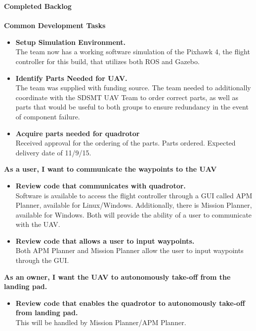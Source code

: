 \vspace{5mm}
\noindent\Large{\textbf{Completed Backlog}}\\
\vspace{2mm}\\
\large{\textbf{Common Development Tasks}}
\normalsize
\begin{itemize}
\item \textbf{Setup Simulation Environment.}\\
The team now has a working software simulation of the Pixhawk 4, the flight controller for this build, that utilizes both ROS and Gazebo.
\item \textbf{Identify Parts Needed for UAV.} \\
The team was supplied with funding source. The team needed to additionally coordinate with the SDSMT UAV Team to order correct parts, as well as parts that would be useful to both groups to ensure redundancy in the event of component failure.
\item \textbf{Acquire parts needed for quadrotor} \\
Received approval for the ordering of the parts. Parts ordered. Expected delivery date of 11/9/15.
\end{itemize}

\vspace{3mm}
\noindent \large{\textbf{As a user, I want to communicate the waypoints to the UAV}}
\normalsize
\begin{itemize}
\item \textbf{Review code that communicates with quadrotor.}\\
 Software is available to access the flight controller through a GUI called APM Planner, available for Linux/Windows. Additionally, there is Mission Planner, available for Windows. Both will provide the ability of a user to communicate with the UAV.
\item \textbf{Review code that allows a user to input waypoints.}\\
Both APM Planner and Mission Planner allow the user to input waypoints through the GUI.  
\end{itemize}

\vspace{4mm}
\noindent \large{\textbf{As an owner, I want the UAV to autonomously take-off from the landing pad.}}
\normalsize
\begin{itemize}
\item \textbf{Review code that enables the quadrotor to autonomously take-off from landing pad.}\\
 This will be handled by Mission Planner/APM Planner.
\end{itemize}

